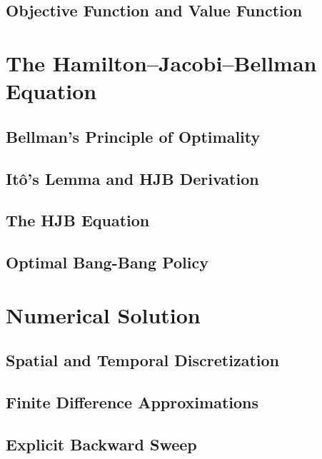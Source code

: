 \documentclass[11pt]{article}
\theoremstyle{plain}
\theoremstyle{definition}
\theoremstyle{remark}
\begin{document}
\subsection{Objective Function and Value Function}
\label{sec:objective}

\section{The Hamilton--Jacobi--Bellman Equation}
\label{sec:hjb}

\subsection{Bellman's Principle of Optimality}
\label{sec:bellman}

\subsection{It\^{o}'s Lemma and HJB Derivation}
\label{sec:ito}

\subsection{The HJB Equation}
\label{sec:hjb_eq}

\subsection{Optimal Bang-Bang Policy}
\label{sec:bangbang}

\section{Numerical Solution}
\label{sec:numerics}

\subsection{Spatial and Temporal Discretization}
\label{sec:grid}

\subsection{Finite Difference Approximations}
\label{sec:fd}

\subsection{Explicit Backward Sweep}
\label{sec:sweep}
\end{document}
